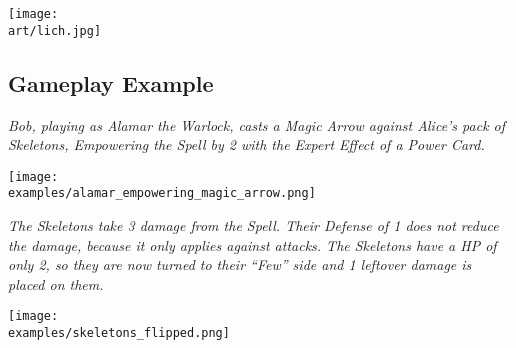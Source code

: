 \begin{multicols}{2}

\texttt{[image: \\art/lich.jpg]}

\subsection*{Gameplay Example}

\textit{Bob, playing as Alamar the Warlock, casts a Magic Arrow against Alice's pack of Skeletons, Empowering  the Spell by 2 with the Expert  Effect  of a Power Card.}

\medskip

\texttt{[image: \\examples/alamar\_empowering\_magic\_arrow.png]}

\medskip

\textit{The Skeletons take 3 damage  from the Spell.
  Their Defense  of 1 does not reduce the damage, because it only applies against attacks.
  The Skeletons have a HP  of only 2, so they are now turned to their ``Few'' side and 1 leftover damage  is placed on them.
}

\bigskip

\texttt{[image: \\examples/skeletons\_flipped.png]}

\end{multicols}
